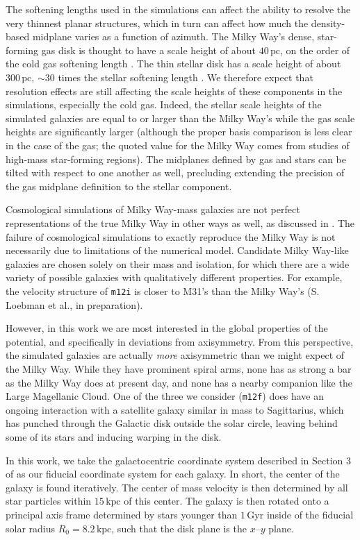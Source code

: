 \documentclass[twocolumn]{aastex62}
\newcommand{\pc}{\text{pc}}
\newcommand{\kpc}{\text{kpc}}
\newcommand{\Gyr}{\text{Gyr}}
\newcommand{\mi}{\texttt{m12i}}
\newcommand{\mf}{\texttt{m12f}}
\begin{document}
The softening lengths used in the simulations can affect the ability to
resolve the very thinnest planar structures, which in turn can affect how much
the density-based midplane varies as a function of azimuth. The Milky Way's
dense, star-forming gas disk is thought to have a scale height of about
$40\,\pc$, on the order of the cold gas softening length
\citep{2019ApJ...871..145A}. The thin stellar disk has a scale height of about
$300\,\pc$, $\sim30$ times the stellar softening length
\citep{2008ApJ...673..864J}. We therefore expect that resolution effects are
still affecting the scale heights of these components in the simulations,
especially the cold gas. Indeed, the stellar scale heights of the simulated
galaxies are equal to or larger than the Milky Way's while the gas scale
heights are significantly larger (although the proper basis comparison is less
clear in the case of the gas; the quoted value for the Milky Way comes from
studies of high-mass star-forming regions). The midplanes defined by gas and
stars can be tilted with respect to one another as well, precluding extending
the precision of the gas midplane definition to the stellar component.

Cosmological simulations of Milky Way-mass galaxies are not perfect
representations of the true Milky Way in other ways as well, as discussed in
\citet{2018arXiv180610564S}. The failure of cosmological simulations to
exactly reproduce the Milky Way is not necessarily due to limitations of the
numerical model. Candidate Milky Way-like galaxies are chosen solely on their
mass and isolation, for which there are a wide variety of possible galaxies
with qualitatively different properties. For example, the velocity structure
of \mi{} is closer to M31's than the Milky Way's (S. Loebman et al., in
preparation).

However, in this work we are most interested in the global properties of the
potential, and specifically in deviations from axisymmetry. From this
perspective, the simulated galaxies are actually \emph{more} axisymmetric than
we might expect of the Milky Way. While they have prominent spiral arms, none
has as strong a bar as the Milky Way does at present day, and none has a
nearby companion like the Large Magellanic Cloud. One of the three we consider
(\mf) does have an ongoing interaction with a satellite galaxy similar in mass
to Sagittarius, which has punched through the Galactic disk outside the solar
circle, leaving behind some of its stars and inducing warping in the disk.

In this work, we take the galactocentric coordinate system described in
Section 3 of \citet{2018arXiv180610564S} as our fiducial coordinate system for
each galaxy. In short, the center of the galaxy is found iteratively. The
center of mass velocity is then determined by all star particles within
$15\,\kpc$ of this center. The galaxy is then rotated onto a principal axis
frame determined by stars younger than $1\,\Gyr$ inside of the fiducial solar
radius $R_{0} = 8.2\,\kpc$, such that the disk plane is the $x$--$y$ plane.
\end{document}
